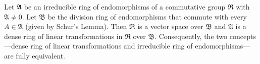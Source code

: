 Let $\mathfrak{A}$ be an irreducible ring of endomorphisms of a commutative group $\mathfrak{R}$ with $\mathfrak{A} \neq 0$. Let $\mathfrak{B}$ be the division ring of endomorphisms that commute with every $A \in \mathfrak{A}$ (given by Schur's Lemma). Then $\mathfrak{R}$ is a vector space over $\mathfrak{B}$ and $\mathfrak{A}$ is a dense ring of linear transformations in $\mathfrak{R}$ over $\mathfrak{B}$. Consequently, the two concepts---dense ring of linear transformations and irreducible ring of endomorphisms---are fully equivalent.
